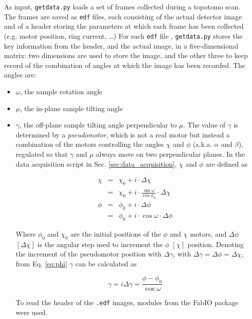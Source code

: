 \documentclass[11pt]{scrartcl}
\begin{document}
As input, {\texttt{getdata.py}} loads a set of frames collected during a topotomo scan. The frames are saved as {\texttt{edf}} files, each consisting of the actual detector image and of a header storing the parameters at which each frame has been collected (e.g. motor position, ring current, \ldots) For each {\texttt{edf}} file , {\texttt{getdata.py}} stores the key information from the header, and the actual image, in a five-dimensional matrix: two dimensions are used to store the image, and the other three to keep record of the combination of angles at which the image has been recorded. The angles are:
\begin{itemize}
    \item $\omega$, the sample rotation angle
    \item $\mu$, the in-plane sample tilting angle
    \item $\gamma$, the off-plane sample tilting angle perpendicular to $\mu$. The value of $\gamma$ is determined by a {\emph{pseudomotor}}, which is not a real motor but instead a combination of the motors controlling the angles $\chi$ and $\phi$ (a.k.a. $\alpha$ and $\beta$), regulated so that $\gamma$ and $\mu$ always move on two perpendicular planes. In the data acquisition script in Sec. \ref{sec:data_acquisition}, $\chi$ and $\phi$ are defined as

    \begin{eqnarray}
        \chi & = & \chi_0 + i \cdot \Delta \chi \label{eq:chi} \\
             & = & \chi_0 + i \cdot \frac{\sin\omega}{\cos\phi_0} \cdot \Delta\chi \\
        \phi & = & \phi_0 + i \cdot \Delta \phi \label{eq:phi} \\
             & = & \phi_0 + i \cdot \cos\omega \cdot \Delta\phi
    \end{eqnarray}

    Where $\phi_0$ and $\chi_0$ are the initial positions of the $\phi$ and $\chi$ motors, and $\Delta\phi$ $[\Delta\chi]$ is the angular step used to increment the $\phi$ $[\chi]$ position. Denoting the increment of the pseudomotor position with $\Delta\gamma$, with $\Delta\gamma = \Delta\phi = \Delta\chi$, from Eq. \ref{eq:phi} $\gamma$ can be calculated as

    \begin{equation}
        \gamma = i \Delta\gamma = \frac{\phi - \phi_0}{\cos\omega}
    \end{equation}

    To read the header of the {\texttt{.edf}} images, modules from the FabIO\cite{knudsen2013fabio} package were used.

\end{itemize}
\end{document}
